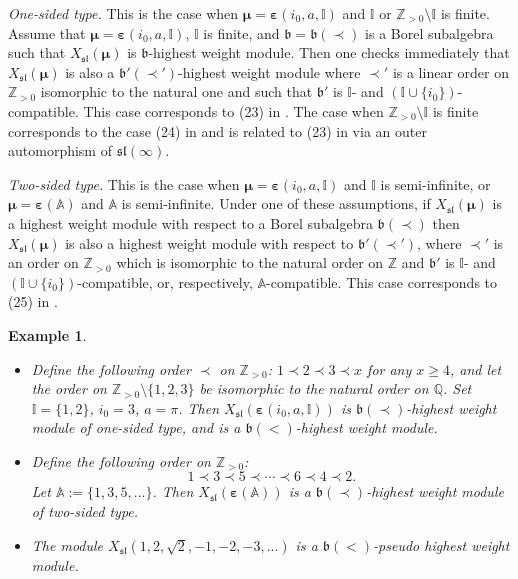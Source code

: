 \documentclass[12pt]{amsart}
\newcommand{\Z}{{\mathbb Z}}
\def\gb{\mathfrak{b}}
\def\Z{\mathbb{Z}}
\newtheorem{examp}[thm]{Example}
\begin{document}
\medskip
\noindent \emph{One-sided type.} This is the case when $\boldsymbol{\mu} = \boldsymbol{\varepsilon} (i_0, a, \mathbb  I)$ and $\mathbb I$ or $\Z_{>0} \setminus \mathbb I$ is finite. Assume that $\boldsymbol{\mu} = \boldsymbol{\varepsilon} (i_0, a, \mathbb I)$, $\mathbb I$ is finite, and $\gb = \gb(\prec)$ is a Borel subalgebra such that $X_{\mathfrak{sl}}(\boldsymbol{\mu})$ is $\gb$-highest weight module. Then one checks immediately that $X_{\mathfrak{sl}}(\boldsymbol{\mu})$ is also a $\gb'(\prec')$-highest weight module where $\prec'$ is a linear order on $\Z_{>0}$ isomorphic to the natural one and  such that $\gb'$ is $\mathbb I$- and $(\mathbb I \cup \{i_0\})$-compatible. This case corresponds to (23) in \cite{PP2}. The case when $\Z_{>0}\setminus \mathbb I$ is finite corresponds to the case  (24) in \cite{PP2} and is related to (23) in \cite{PP2} via an outer automorphism of $\mathfrak{sl} (\infty)$.


\medskip
\noindent 
\emph{Two-sided type.} This is the case when $\boldsymbol{\mu} = \boldsymbol{\varepsilon} (i_0, a, \mathbb  I)$ and $\mathbb I$ is semi-infinite,  or $\boldsymbol{\mu} = \boldsymbol{\varepsilon} (\mathbb A) $ and $\mathbb A$ is  semi-infinite. Under one of these assumptions, if $X_{\mathfrak{sl}}(\boldsymbol{\mu})$ is a highest weight module with respect to a Borel subalgebra $\gb (\prec)$ then  $X_{\mathfrak{sl}}(\boldsymbol{\mu})$ is also a highest weight module with respect to $ \gb' (\prec')$, where $\prec'$ is an order on $\Z_{>0}$ which is isomorphic to the natural order on $\Z$ and $\gb'$ is $\mathbb I$- and $(\mathbb I \cup \{i_0\})$-compatible, or, respectively, $\mathbb A$-compatible. This case corresponds to (25) in \cite{PP2}.





\begin{examp}  
\begin{itemize}
\item[(i)] Define the following order $\prec$ on $\Z_{>0}$: $1 \prec 2 \prec 3 \prec x $ for any $x \geq 4$, and let  the order on $\Z_{>0}\setminus \{1,2,3 \}$ be isomorphic to the natural order on $\mathbb Q$. Set $\mathbb I = \{ 1,2\}$, $i_0 = 3$, $a = \pi$. Then $X_{\mathfrak{sl}}(\boldsymbol{\varepsilon} (i_0, a, \mathbb I))$ is $\gb(\prec)$-highest weight module of one-sided type, and  is a $\gb(<)$-highest weight module.
\item[(ii)] Define the following order on $\Z_{>0}$:
$$1 \prec 3 \prec 5 \prec \cdots \prec 6 \prec 4 \prec 2.$$
Let $\mathbb  A := \{1,3,5,... \}$. Then   $X_{\mathfrak{sl}}(\boldsymbol{\varepsilon} (\mathbb A))$ is a $\gb(\prec)$-highest weight module of two-sided type.
\item[(iii)] The module $X_{\mathfrak{sl}}(1,2,\sqrt{2}, -1,-2,-3,...)$ is a $\gb (<)$-pseudo highest weight module.
\end{itemize}
\end{examp}
\end{document}
